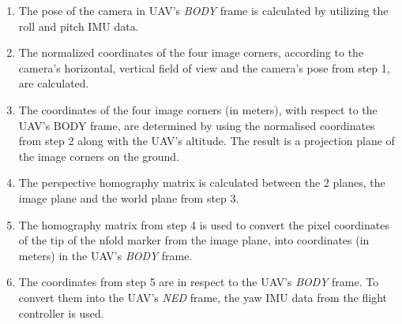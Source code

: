 \documentclass[conference, onecolumn, draftclsnofoot]{IEEEtran}
\begin{document}
\begin{enumerate}

\item The pose of the camera in UAV's \emph{BODY} frame is calculated by 
utilizing the roll and pitch IMU data.


\item The normalized coordinates of the four image corners, according to the 
camera's horizontal, vertical field of view and the camera's pose from step 1, 
are calculated.


\item The coordinates of the four image corners (in meters), with respect to 
the UAV's BODY frame, are determined by using the normalised coordinates from 
step 2 along with the UAV's altitude. The result is a projection plane of the 
image corners on the ground.


\item The perspective homography matrix is calculated between the 2 planes, 
the image plane and the world plane from step 3.

\item The homography matrix from step 4 is used to convert the pixel coordinates 
of the tip of the nfold marker from the image plane, into  coordinates (in meters) 
in the UAV's \emph{BODY} frame.


\item The coordinates from step 5 are in respect to the UAV's \emph{BODY} frame. 
To convert them into the UAV's \emph{NED} frame, the yaw IMU data from the flight 
controller is used. 


\end{enumerate}
\end{document}
